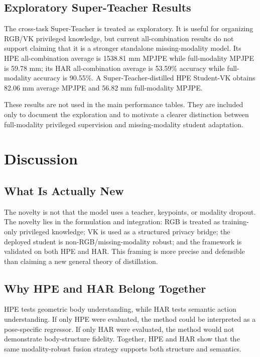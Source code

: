 \documentclass[journal]{IEEEtran}
\newcommand{\mpjpe}{MPJPE}
\begin{document}
\subsection{Exploratory Super-Teacher Results}

The cross-task Super-Teacher is treated as exploratory. It is useful for organizing RGB/VK privileged knowledge, but current all-combination results do not support claiming that it is a stronger standalone missing-modality model. Its HPE all-combination average is 1538.81 mm \mpjpe{} while full-modality \mpjpe{} is 59.78 mm; its HAR all-combination average is 53.59\% accuracy while full-modality accuracy is 90.55\%. A Super-Teacher-distilled HPE Student-VK obtains 82.06 mm average \mpjpe{} and 56.82 mm full-modality \mpjpe{}.

These results are not used in the main performance tables. They are included only to document the exploration and to motivate a clearer distinction between full-modality privileged supervision and missing-modality student adaptation.

\section{Discussion}

\subsection{What Is Actually New}

The novelty is not that the model uses a teacher, keypoints, or modality dropout. The novelty lies in the formulation and integration: RGB is treated as training-only privileged knowledge; VK is used as a structured privacy bridge; the deployed student is non-RGB/missing-modality robust; and the framework is validated on both HPE and HAR. This framing is more precise and defensible than claiming a new general theory of distillation.

\subsection{Why HPE and HAR Belong Together}

HPE tests geometric body understanding, while HAR tests semantic action understanding. If only HPE were evaluated, the method could be interpreted as a pose-specific regressor. If only HAR were evaluated, the method would not demonstrate body-structure fidelity. Together, HPE and HAR show that the same modality-robust fusion strategy supports both structure and semantics.
\end{document}
